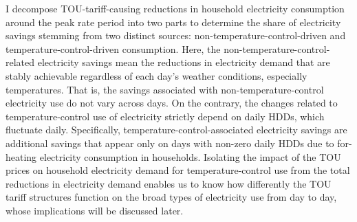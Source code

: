 I decompose TOU-tariff-causing reductions in household electricity consumption around the peak rate period into two parts to determine the share of electricity savings stemming from two distinct sources: non-temperature-control-driven and temperature-control-driven consumption. Here, the non-temperature-control-related electricity savings mean the reductions in electricity demand that are stably achievable regardless of each day's weather conditions, especially temperatures. That is, the savings associated with non-temperature-control electricity use do not vary across days. On the contrary, the changes related to temperature-control use of electricity strictly depend on daily HDDs, which fluctuate daily. Specifically, temperature-control-associated electricity savings are additional savings that appear only on days with non-zero daily HDDs due to for-heating electricity consumption in households. Isolating the impact of the TOU prices on household electricity demand for temperature-control use from the total reductions in electricity demand enables us to know how differently the TOU tariff structures function on the broad types of electricity use from day to day, whose implications will be discussed later.

